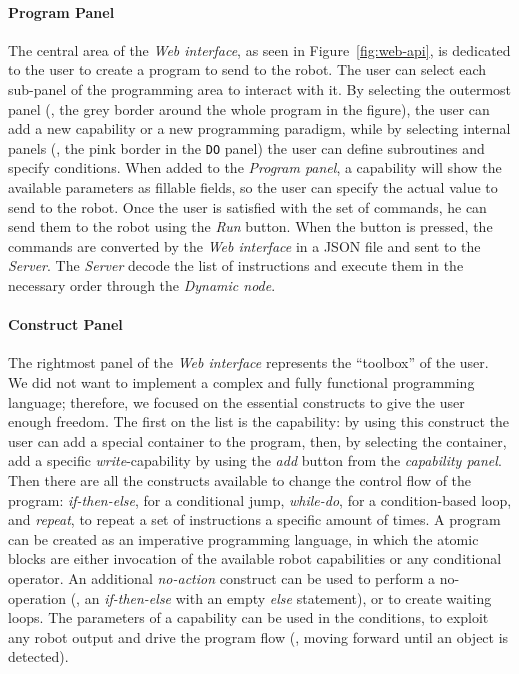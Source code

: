 \paragraph{Program Panel} The central area of the \textit{Web interface}, as seen in Figure~\ref{fig:web-api}, is dedicated to the user to create a program to send to the robot. The user can select each sub-panel of the programming area to interact with it. By selecting the outermost panel (\ie, the grey border around the whole program in the figure), the user can add a new capability or a new programming paradigm, while by selecting internal panels (\eg, the pink border in the \texttt{DO} panel) the user can define subroutines and specify conditions. When added to the \textit{Program panel}, a capability will show the available parameters as fillable fields, so the user can specify the actual value to send to the robot. Once the user is satisfied with the set of commands, he can send them to the robot using the \textit{Run} button. When the button is pressed, the commands are converted by the \textit{Web interface} in a JSON file and sent to the \textit{Server}. The \textit{Server} decode the list of instructions and execute them in the necessary order through the \textit{Dynamic node}.

\paragraph{Construct Panel} The rightmost panel of the \textit{Web interface} represents the ``toolbox'' of the user. We did not want to implement a complex and fully functional programming language; therefore, we focused on the essential constructs to give the user enough freedom. The first on the list is the capability: by using this construct the user can add a special container to the program, then, by selecting the container, add a specific \textit{write}-capability by using the \textit{add} button from the \textit{capability panel}. Then there are all the constructs available to change the control flow of the program: \textit{if-then-else}, for a conditional jump, \textit{while-do}, for a condition-based loop, and \textit{repeat}, to repeat a set of instructions a specific amount of times. A program can be created as an imperative programming language, in which the atomic blocks are either invocation of the available robot capabilities or any conditional operator. An additional \textit{no-action} construct can be used to perform a no-operation (\eg, an \textit{if-then-else} with an empty \textit{else} statement), or to create waiting loops. The parameters of a capability can be used in the conditions, to exploit any robot output and drive the program flow (\eg, moving forward until an object is detected). 

